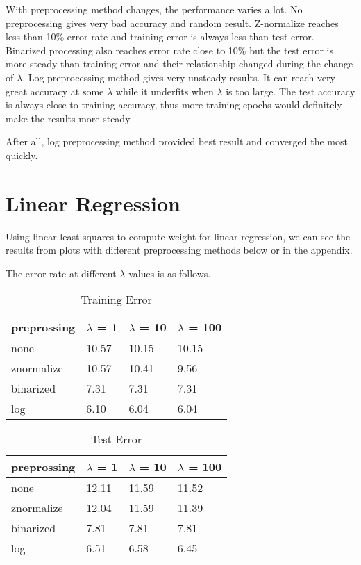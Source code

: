 \documentclass[11pt, oneside]{article}
\begin{document}
With preprocessing method changes, the performance varies a lot. No preprocessing gives very bad accuracy and random result. Z-normalize reaches less than 10\% error rate and training error is always less than test error. Binarized processing also reaches error rate close to 10\% but the test error is more steady than training error and their relationship changed during the change of $\lambda$. Log preprocessing method gives very unsteady results. It can reach very great accuracy at some $\lambda$ while it underfits when $\lambda$ is too large. The test accuracy is always close to training accuracy, thus more training epochs would definitely make the results more steady.

After all, log preprocessing method provided best result and converged the most quickly.


\section{Linear Regression}

Using linear least squares to compute weight for linear regression, we can see the results from plots with different preprocessing methods below or in the appendix.

The error rate at different $\lambda$ values is as follows.

\begin{table}[h]
\centering
\caption{Training Error}
\begin{tabular}{l|lll}
\hline
preprossing & $\lambda$ = 1     & $\lambda$ = 10    & $\lambda$ = 100   \\
\hline
none       & 10.57 & 10.15 & 10.15 \\
znormalize & 10.57 & 10.41 & 9.56  \\
binarized  & 7.31 & 7.31 & 7.31 \\
log        & 6.10  & 6.04  & 6.04 \\
\hline
\end{tabular}
\end{table}

\begin{table}[h]
\centering
\caption{Test Error}
\begin{tabular}{l|lll}
\hline
preprossing & $\lambda$ = 1     & $\lambda$ = 10    & $\lambda$ = 100   \\
\hline
none       & 12.11 & 11.59 & 11.52 \\
znormalize & 12.04 & 11.59 & 11.39  \\
binarized  & 7.81 & 7.81 & 7.81 \\
log        & 6.51  & 6.58  & 6.45 \\
\hline
\end{tabular}
\end{table}
\end{document}
